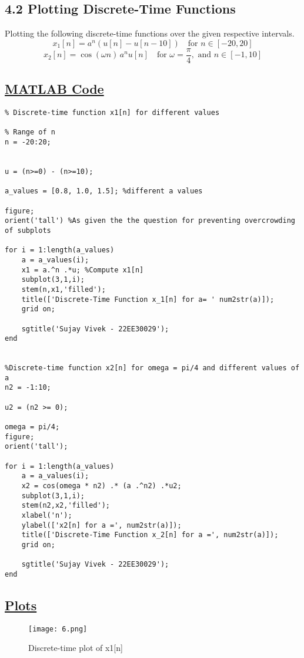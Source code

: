 \documentclass[a4paper,12pt,fleqn]{article}
\begin{document}
\subsection*{4.2 Plotting Discrete-Time Functions} 
Plotting the following discrete-time functions over the given respective intervals.
\[
x_1[n] = a^n \left( u[n] - u[n - 10] \right) \quad \text{for } n \in [-20, 20]
\]
\[
x_2[n] = \cos(\omega n) \, a^n u[n] \quad \text{for } \omega = \frac{\pi}{4}, \text{ and } n \in [-1, 10]
\]

\subsection*{\underline{MATLAB Code}}
\begin{lstlisting}
% Discrete-time function x1[n] for different values

% Range of n
n = -20:20; 


u = (n>=0) - (n>=10);

a_values = [0.8, 1.0, 1.5]; %different a values

figure;
orient('tall') %As given the the question for preventing overcrowding of subplots

for i = 1:length(a_values)
    a = a_values(i);
    x1 = a.^n .*u; %Compute x1[n]
    subplot(3,1,i);
    stem(n,x1,'filled');
    title(['Discrete-Time Function x_1[n] for a= ' num2str(a)]);
    grid on;

    sgtitle('Sujay Vivek - 22EE30029');
end


%Discrete-time function x2[n] for omega = pi/4 and different values of a
n2 = -1:10;

u2 = (n2 >= 0);

omega = pi/4;
figure;
orient('tall');

for i = 1:length(a_values)
    a = a_values(i);
    x2 = cos(omega * n2) .* (a .^n2) .*u2;
    subplot(3,1,i);
    stem(n2,x2,'filled');
    xlabel('n');
    ylabel(['x2[n] for a =', num2str(a)]);
    title(['Discrete-Time Function x_2[n] for a =', num2str(a)]);
    grid on;

    sgtitle('Sujay Vivek - 22EE30029');
end

\end{lstlisting}

\subsection*{\underline{Plots}}
\begin{figure}[h]
    \centering
    \texttt{[image: 6.png]}
    \caption{Discrete-time plot of x1[n]}
    \label{fig:enter-label}
\end{figure}
\end{document}
